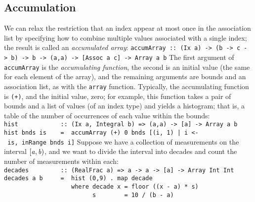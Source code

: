 \subsection{Accumulation}
We can relax the restriction that an index appear at most once in the
association list by specifying how to combine multiple values
associated with a single index; the result is called an {\em accumulated
array}:
\bprog
\mbox{\tt accumArray\ ::\ (Ix\ a)\ ->\ (b\ ->\ c\ ->\ b)\ ->\ b\ ->\ (a,a)\ ->\ [Assoc\ a\ c]\ ->\ Array\ a\ b}
\eprog
The first argument of \mbox{\tt accumArray} is the {\em accumulating function},
the second is an initial value (the same for each element of the array),
and the remaining arguments are bounds and an association list, as with
the \mbox{\tt array} function.  Typically, the accumulating function is \mbox{\tt (+)}, and
the initial value, zero; for example, this function takes a pair of
bounds and a list of values (of an index type) and yields a histogram;
that is, a table of the number of occurrences of each value within the
bounds:
\bprog
\mbox{\tt hist\ \ \ \ \ \ \ \ \ \ \ \ ::\ (Ix\ a,\ Integral\ b)\ =>\ (a,a)\ ->\ [a]\ ->\ Array\ a\ b}\\
\mbox{\tt hist\ bnds\ is\ \ \ \ =\ \ accumArray\ (+)\ 0\ bnds\ [(i,\ 1)\ |\ i\ <-\ is,\ inRange\ bnds\ i]}
\eprog
Suppose we have a collection of measurements on the interval \mbox{$\it [a,b)$}, and
we want to divide the interval into decades and count the number of
measurements within each:
\bprog
\mbox{\tt decades\ \ \ \ \ \ \ \ \ ::\ (RealFrac\ a)\ =>\ a\ ->\ a\ ->\ [a]\ ->\ Array\ Int\ Int}\\
\mbox{\tt decades\ a\ b\ \ \ \ \ =\ \ hist\ (0,9)\ .\ map\ decade}\\
\mbox{\tt \ \ \ \ \ \ \ \ \ \ \ \ \ \ \ \ \ \ \ where\ decade\ x\ =\ floor\ ((x\ -\ a)\ *\ s)}\\
\mbox{\tt \ \ \ \ \ \ \ \ \ \ \ \ \ \ \ \ \ \ \ \ \ \ \ \ \ s\ \ \ \ \ \ \ \ =\ 10\ /\ (b\ -\ a)}
\eprog


